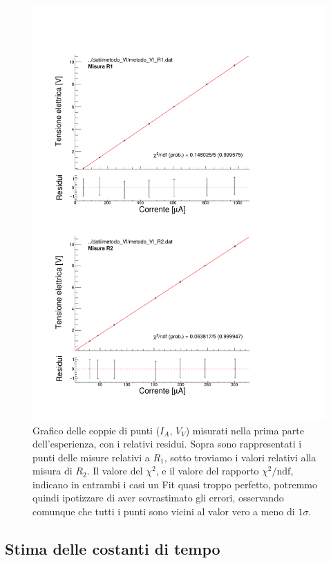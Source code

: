 \documentclass[italian, a4paper, 10pt, twocolumn]{../../style/lab_unige}
\newcommand{\ChiSqr}{$\chi^2$\space}
\newcommand{\ChiNdf}{$\chi^2/\text{ndf}$}
\begin{document}
    \begin{figure}
        \centering
        \includegraphics[width=\linewidth]{misura_R1_R2.pdf}
        \caption{Grafico delle coppie di punti ($I_A$, $V_V$) misurati nella prima parte dell'esperienza, con i relativi residui. Sopra sono rappresentati i punti delle misure relativi a $R_1$, sotto troviamo i valori relativi alla misura di $R_2$. Il valore del \ChiSqr, e il valore del rapporto \ChiNdf, indicano in entrambi i casi un Fit quasi troppo perfetto, potremmo quindi ipotizzare di aver sovrastimato gli errori, osservando comunque che tutti i punti sono vicini al valor vero a meno di $1\sigma$.}
        \label{figure:plot_R1_R2}
    \end{figure}

    \subsection{Stima delle costanti di tempo}
\end{document}
